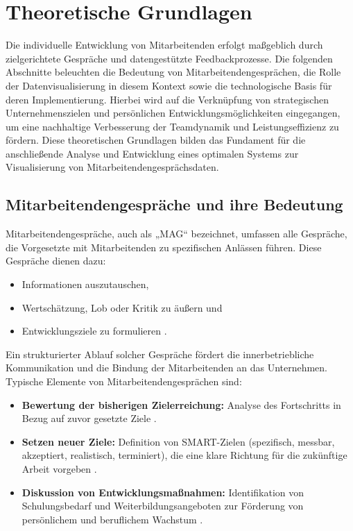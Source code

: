 \chapter{Theoretische Grundlagen}
\label{chap:theoretische-grundlagen}

Die individuelle Entwicklung von Mitarbeitenden erfolgt maßgeblich durch zielgerichtete Gespräche und datengestützte Feedbackprozesse. Die folgenden Abschnitte beleuchten die Bedeutung von Mitarbeitendengesprächen, die Rolle der Datenvisualisierung in diesem Kontext sowie die technologische Basis für deren Implementierung. Hierbei wird auf die Verknüpfung von strategischen Unternehmenszielen und persönlichen Entwicklungsmöglichkeiten eingegangen, um eine nachhaltige Verbesserung der Teamdynamik und Leistungseffizienz zu fördern. Diese theoretischen Grundlagen bilden das Fundament für die anschließende Analyse und Entwicklung eines optimalen Systems zur Visualisierung von Mitarbeitendengesprächsdaten.

\section{Mitarbeitendengespräche und ihre Bedeutung}
Mitarbeitendengespräche, auch als „MAG“ bezeichnet, umfassen alle Gespräche, die Vorgesetzte mit Mitarbeitenden zu spezifischen Anlässen führen. Diese Gespräche dienen dazu:
\begin{itemize}
    \item Informationen auszutauschen,
    \item Wertschätzung, Lob oder Kritik zu äußern und
    \item Entwicklungsziele zu formulieren \cite{schober2008}.
\end{itemize}

Ein strukturierter Ablauf solcher Gespräche fördert die innerbetriebliche Kommunikation und die Bindung der Mitarbeitenden an das Unternehmen. Typische Elemente von Mitarbeitendengesprächen sind:
\begin{itemize}
    \item \textbf{Bewertung der bisherigen Zielerreichung:} Analyse des Fortschritts in Bezug auf zuvor gesetzte Ziele \cite{duarte2012performance}.
    \item \textbf{Setzen neuer Ziele:} Definition von SMART-Zielen (spezifisch, messbar, akzeptiert, realistisch, terminiert), die eine klare Richtung für die zukünftige Arbeit vorgeben \cite{duarte2012performance}.
    \item \textbf{Diskussion von Entwicklungsmaßnahmen:} Identifikation von Schulungsbedarf und Weiterbildungsangeboten zur Förderung von persönlichem und beruflichem Wachstum \cite{bryson2011employee}.
\end{itemize}

